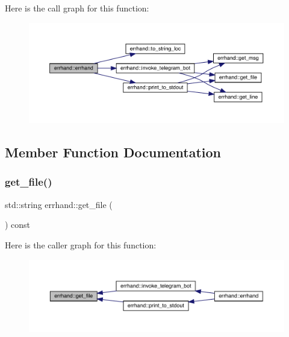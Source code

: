 Here is the call graph for this function\+:\nopagebreak
\begin{figure}[H]
\begin{center}
\leavevmode
\includegraphics[width=350pt]{classerrhand_a69afd61e0ebf5ee9d35f297dc2d5c086_cgraph}
\end{center}
\end{figure}


\subsection{Member Function Documentation}
\mbox{\label{classerrhand_a1556ee8d0aaefeea3bbab73f7ae50914}} 
\subsubsection{\texorpdfstring{get\+\_\+file()}{get\_file()}}
{\footnotesize\ttfamily std\+::string errhand\+::get\+\_\+file (\begin{DoxyParamCaption}{ }\end{DoxyParamCaption}) const\hspace{0.3cm}{\ttfamily [inline]}}

Here is the caller graph for this function\+:\nopagebreak
\begin{figure}[H]
\begin{center}
\leavevmode
\includegraphics[width=350pt]{classerrhand_a1556ee8d0aaefeea3bbab73f7ae50914_icgraph}
\end{center}
\end{figure}
\mbox{\label{classerrhand_a258f97d84476b21efc38827cda3e5889}} 
